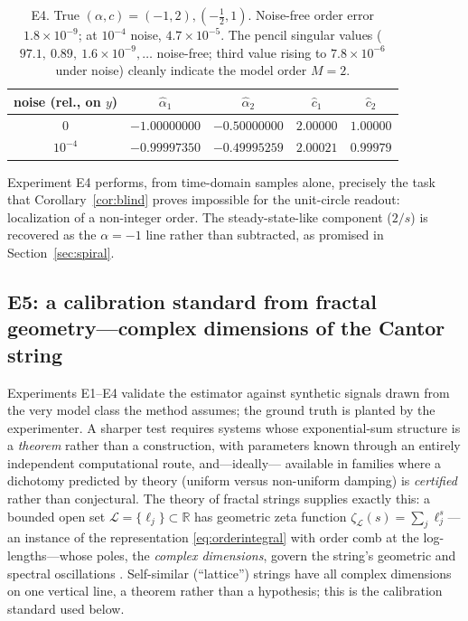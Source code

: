 \documentclass[11pt, a4paper]{article}
\theoremstyle{definition}
\theoremstyle{remark}
\newcommand{\R}{\mathbb{R}}
\begin{document}
\begin{table}[ht]
\centering\small
\begin{tabular}{ccccc}
\toprule
noise (rel., on $y$) & $\hat\alpha_1$ & $\hat\alpha_2$ &
$\hat c_1$ & $\hat c_2$ \\
\midrule
$0$        & $-1.00000000$ & $-0.50000000$ & $2.00000$ & $1.00000$ \\
$10^{-4}$  & $-0.99997350$ & $-0.49995259$ & $2.00021$ & $0.99979$ \\
\bottomrule
\end{tabular}
\caption{E4. True $(\alpha, c)=(-1,2), (-\tfrac12,1)$. Noise-free order
error $1.8\times10^{-9}$; at $10^{-4}$ noise, $4.7\times10^{-5}$. The
pencil singular values ($97.1, \ 0.89,\ 1.6\times10^{-9}, \dots$
noise-free; third value rising to $7.8\times10^{-6}$ under noise) cleanly
indicate the model order $M=2$.}
\label{tab:E4}
\end{table}

Experiment E4 performs, from time-domain samples alone, precisely the task
that Corollary~\ref{cor:blind} proves impossible for the unit-circle
readout: localization of a non-integer order. The steady-state-like
component ($2/s$) is recovered as the $\alpha=-1$ line rather than
subtracted, as promised in Section~\ref{sec:spiral}.

\subsection{E5: a calibration standard from fractal geometry---complex
dimensions of the Cantor string}\label{sec:e5}

Experiments E1--E4 validate the estimator against synthetic signals drawn
from the very model class the method assumes; the ground truth is planted
by the experimenter. A sharper test requires systems whose exponential-sum
structure is a \emph{theorem} rather than a construction, with parameters
known through an entirely independent computational route, and---ideally---
available in families where a dichotomy predicted by theory (uniform versus
non-uniform damping) is \emph{certified} rather than conjectural. The
theory of fractal strings supplies exactly this: a bounded open set
$\mathcal{L}=\{\ell_j\}\subset\R$ has geometric zeta function
$\zeta_{\mathcal{L}}(s)=\sum_j \ell_j^{s}$---an instance of the
representation \eqref{eq:orderintegral} with order comb at the
log-lengths---whose poles, the \emph{complex dimensions}, govern the
string's geometric and spectral oscillations
\cite{LapidusPomerance1993,LapidusVanFrankenhuijsen2013}.
Self-similar (``lattice'') strings have all complex dimensions on one
vertical line, a theorem rather than a hypothesis; this is the calibration
standard used below.
\end{document}
